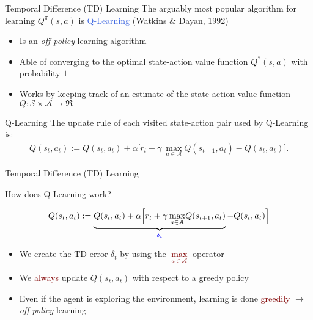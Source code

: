 \documentclass{beamer}
\begin{document}
\begin{frame}{Temporal Difference (TD) Learning}
	The arguably most popular algorithm for learning $Q^{\pi}(s,a)$ is \textcolor{RoyalBlue}{Q-Learning} (Watkins \& Dayan, 1992)

	\begin{itemize}
		\item Is an \textit{off-policy} learning algorithm 
		\item Able of converging to the optimal state-action value function $Q^{*}(s,a)$ with probability $1$
		\item Works by keeping track of an estimate of the state-action value function $Q: \mathcal{S} \times \mathcal{A} \rightarrow \Re$
	\end{itemize}

	\begin{block}{Q-Learning}
		The update rule of each visited state-action pair used by Q-Learning is:
		\begin{align*}
			Q(s_t,a_t):=Q(s_t,a_t) + \alpha\Big[r_t + \gamma \:\underset{a\in \mathcal{A}}{\max} Q(s_{t+1},a_t) - Q(s_t, a_t) \Big].
		\end{align*}
	\end{block}

\end{frame}

\begin{frame}{Temporal Difference (TD) Learning}

	How does Q-Learning work?

	\begin{align*}
		Q(s_t,a_t):=\underbrace{Q(s_t,a_t) + \alpha\Big[r_t + \gamma \:\underset{a\in \mathcal{A}}{\max} Q(s_{t+1},a_t)}_{\textcolor{blue}{\delta_t}} - Q(s_t, a_t) \Big]
	\end{align*}

	\begin{itemize}
		\item \onslide<+-> We create the TD-error $\delta_t$ by using the \textcolor{Maroon}{$\underset{a\in \mathcal{A}}{\max}$} operator 
		\item \onslide<+-> We \textcolor{Maroon}{always} update $Q(s_t,a_t)$ with respect to a greedy policy
		\item \onslide<+-> Even if the agent is exploring the environment, learning is done \textcolor{Maroon}{greedily} $\rightarrow$ \textit{off-policy} learning
	\end{itemize}

\end{frame}
\end{document}
